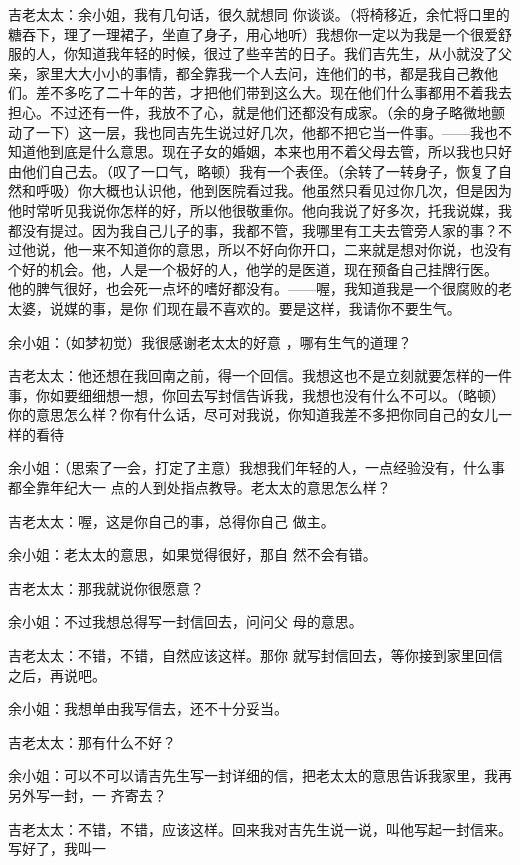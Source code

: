 \documentclass{article}
\begin{document}
吉老太太：余小姐，我有几句话，很久就想同
\newpage
你谈谈。（将椅移近，余忙将口里的糖吞下，理了一理裙子，坐直了身子，用心地听）我想你一定以为我是一个很爱舒服的人，你知道我年轻的时候，很过了些辛苦的日子。我们吉先生，从小就没了父亲，家里大大小小的事情，都全靠我一个人去问，连他们的书，都是我自己教他们。差不多吃了二十年的苦，才把他们带到这么大。现在他们什么事都用不着我去担心。不过还有一件，我放不了心，就是他们还都没有成家。（余的身子略微地颤动了一下）这一层，我也同吉先生说过好几次，他都不把它当一件事。——我也不知道他到底是什么意思。现在子女的婚姻，本来也用不着父母去管，所以我也只好由他们自己去。（叹了一口气，略顿）我有一个表侄。（余转了一转身子，恢复了自然和呼吸）你大概也认识他，他到医院看过我。他虽然只看见过你几次，但是因为他时常听见我说你怎样的好，所以他很敬重你。他向我说了好多次，托我说媒，我都没有提过。因为我自己儿子的事，我都不管，我哪里有工夫去管旁人家的事？不过他说，他一来不知道你的意思，所以不好向你开口，二来就是想对你说，也没有个好的机会。他，人是一个极好的人，他学的是医道，现在预备自己挂牌行医。
\newpage
他的脾气很好，也会死一点坏的嗜好都没有。——喔，我知道我是一个很腐败的老太婆，说媒的事，是你
们现在最不喜欢的。要是这样，我请你不要生气。 


余小姐：（如梦初觉）我很感谢老太太的好意
，哪有生气的道理？ 

吉老太太：他还想在我回南之前，得一个回信。我想这也不是立刻就要怎样的一件事，你如要细细想一想，你回去写封信告诉我，我想也没有什么不可以。（略顿）你的意思怎么样？你有什么话，尽可对我说，你知道我差不多把你同自己的女儿一样的看待

余小姐：（思索了一会，打定了主意）我想我们年轻的人，一点经验没有，什么事都全靠年纪大一
点的人到处指点教导。老太太的意思怎么样？ 

吉老太太：喔，这是你自己的事，总得你自己
做主。 

\newpage

余小姐：老太太的意思，如果觉得很好，那自
然不会有错。 


吉老太太：那我就说你很愿意？ 

余小姐：不过我想总得写一封信回去，问问父
母的意思。 

吉老太太：不错，不错，自然应该这样。那你
就写封信回去，等你接到家里回信之后，再说吧。 

余小姐：我想单由我写信去，还不十分妥当。


吉老太太：那有什么不好？ 

余小姐：可以不可以请吉先生写一封详细的信，把老太太的意思告诉我家里，我再另外写一封，一
齐寄去？ 

吉老太太：不错，不错，应该这样。回来我对吉先生说一说，叫他写起一封信来。写好了，我叫一
\newpage
\end{document}
